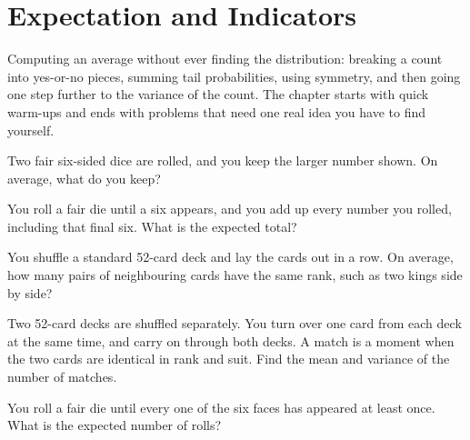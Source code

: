 \chapter{Expectation and Indicators}\label{ch:iv1:expectation-and-indicators}

\begin{ivtrains}
Computing an average without ever finding the distribution: breaking a count into yes-or-no pieces, summing
tail probabilities, using symmetry, and then going one step further to the variance of the count. The chapter
starts with quick warm-ups and ends with problems that need one real idea you have to find yourself.
\end{ivtrains}

\begin{question}\label{iq:iv1:expectation-and-indicators:1}
Two fair six-sided dice are rolled, and you keep the larger number shown. On average, what do you keep?
\end{question}

\begin{question}\label{iq:iv1:expectation-and-indicators:2}
You roll a fair die until a six appears, and you add up every number you rolled, including that final six. What
is the expected total?
\end{question}

\begin{question}\label{iq:iv1:expectation-and-indicators:3}
You shuffle a standard 52-card deck and lay the cards out in a row. On average, how many pairs of neighbouring
cards have the same rank, such as two kings side by side?
\end{question}

\begin{question}\label{iq:iv1:expectation-and-indicators:4}
Two 52-card decks are shuffled separately. You turn over one card from each deck at the same time, and carry on
through both decks. A match is a moment when the two cards are identical in rank and suit. Find the mean and variance of the number of matches.
\end{question}

\begin{question}\label{iq:iv1:expectation-and-indicators:5}
You roll a fair die until every one of the six faces has appeared at least once. What is the expected number of
rolls?
\end{question}

